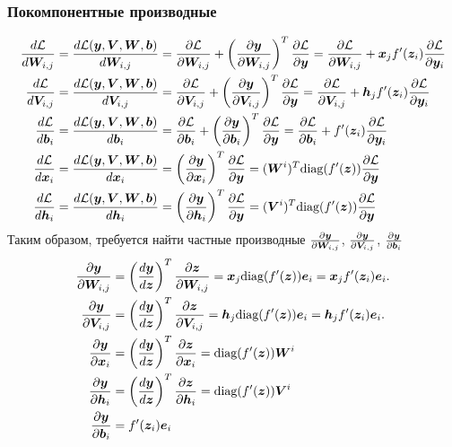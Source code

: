 \documentclass{report}
\numberwithin{theorem}{chapter}
\numberwithin{statement}{chapter}
\numberwithin{lemma}{chapter}
\theoremstyle{definition}
\numberwithin{task}{chapter}
\theoremstyle{remark}
\numberwithin{example}{chapter}
\theoremstyle{definition}
\numberwithin{definition}{chapter}
\theoremstyle{remark}
\theoremstyle{remark}
\numberwithin{lyrics}{section}
\begin{document}
\subsubsection{Покомпонентные производные}
\begin{align}
\frac{d\Loss}{d\boldW_{i,j}} & = \frac{d\Loss(\boldy, \boldV, \boldW, \boldb)}{d\boldW_{i,j}} = \partder{\Loss}{\boldW_{i, j}} + \left(\partder{\boldy}{\boldW_{i,j}}\right)^T \partder{\Loss}{\boldy} =  \partder{\Loss}{\boldW_{i, j}} + \boldx_j f'(\boldz_i) \partder{\Loss}{\boldy_i} \\ 
\frac{d\Loss}{d\boldV_{i,j}} & = \frac{d\Loss(\boldy, \boldV, \boldW, \boldb)}{d\boldV_{i,j}} = \partder{\Loss}{\boldV_{i, j}} + \left(\partder{\boldy}{\boldV_{i,j}}\right)^T \partder{\Loss}{\boldy} = \partder{\Loss}{\boldV_{i, j}} + \boldh_j f'(\boldz_i) \partder{\Loss}{\boldy_i} \\\
\frac{d\Loss}{d\boldb_{i}} & = \frac{d\Loss(\boldy, \boldV, \boldW, \boldb)}{d\boldb_{i}} = \partder{\Loss}{\boldb_i} + \left(\partder{\boldy}{\boldb_i}\right)^T \partder{\Loss}{\boldy} = \partder{\Loss}{\boldb_i} + f'(\boldz_i)\partder{\Loss}{\boldy_i} \ \\
\frac{d\Loss}{d\boldx_{i}} & = \frac{d\Loss(\boldy, \boldV, \boldW, \boldb)}{d\boldx_{i}} = \left(\partder{\boldy}{\boldx_i}\right)^T\partder{\Loss}{\boldy} =
(\boldW^i)^T \diag (f'(\boldz)) \partder{\Loss}{\boldy} \\
\frac{d\Loss}{d\boldh_{i}} & = \frac{d\Loss(\boldy, \boldV, \boldW, \boldb)}{d\boldh_{i}} = \left(\partder{\boldy}{\boldh_i}\right)^T\partder{\Loss}{\boldy} =
(\boldV^i)^T \diag (f'(\boldz))  \partder{\Loss}{\boldy}
\end{align}
Таким образом, требуется найти частные производные $\partder{\boldy}{\boldW_{i,j}}$, $\partder{\boldy}{\boldV_{i,j}}$, $\partder{\boldy}{\boldb_{i}}$
\begin{align*}
\partder{\boldy}{\boldW_{i,j}} &= \left(\frac{d\boldy}{d\boldz}\right)^T \frac{\partial\boldz}{\partial\boldW_{i, j}} =  \boldx_j \diag(f'(\boldz))\bolde_i =  \boldx_j  f'(\boldz_i) \bolde_i. \\
\frac{\partial \boldy}{\partial \boldV_{i, j}} &= \left(\frac{d\boldy}{d\boldz}\right)^T \frac{\partial\boldz}{\partial\boldV_{i, j}}  = \boldh_j \diag(f'(\boldz))  \bolde_i= \boldh_j f'(\boldz_i) \bolde_i.\\ 
\frac{\partial \boldy}{\partial \boldx_{i}} &= \left(\frac{d\boldy}{d\boldz}\right)^T \frac{\partial\boldz}{\partial\boldx_{i}} = \diag(f'(\boldz)) \boldW^i\\
\frac{\partial \boldy}{\partial \boldh_{i}} &= \left(\frac{d\boldy}{d\boldz}\right)^T \frac{\partial\boldz}{\partial\boldh_{i}} = \diag(f'(\boldz)) \boldV^i\\
\frac{\partial \boldy}{\partial \boldb_{i}} &= f'(\boldz_i)\bolde_i 
\end{align*}
\end{document}
